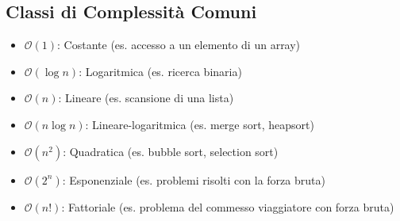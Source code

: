 \subsection{Classi di Complessità Comuni}
\begin{itemize}
    \item $\mathcal{O}(1)$: Costante (es. accesso a un elemento di un array)
    \item $\mathcal{O}(\log n)$: Logaritmica (es. ricerca binaria)
    \item $\mathcal{O}(n)$: Lineare (es. scansione di una lista)
    \item $\mathcal{O}(n \log n)$: Lineare-logaritmica (es. merge sort, heapsort)
    \item $\mathcal{O}(n^2)$: Quadratica (es. bubble sort, selection sort)
    \item $\mathcal{O}(2^n)$: Esponenziale (es. problemi risolti con la forza bruta)
    \item $\mathcal{O}(n!)$: Fattoriale (es. problema del commesso viaggiatore con forza bruta)
\end{itemize}